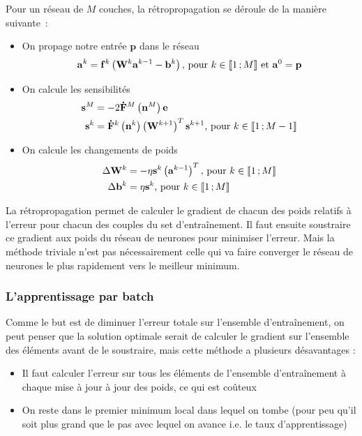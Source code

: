 Pour un réseau de $M$ couches, la rétropropagation se déroule de la manière suivante~:
\begin{itemize}
 \item On propage notre entrée $\mathbf{p}$ dans le réseau
 \begin{equation}
   \mathbf{a}^k = \mathbf{f}^k\left(\mathbf{W}^k\mathbf{a}^{k-1} - \mathbf{b}^k\right) \text{, pour $k \in \mathopen{\llbracket}1\,;M\mathclose{\rrbracket}$ et $\mathbf{a}^0 = \mathbf{p}$}
 \end{equation}
 
 \item On calcule les sensibilités 
 \begin{align}
  \mathbf{s}^M &= -2\mathbf{\dot F}^M\left(\mathbf{n}^M\right)\mathbf{e} \\
  \mathbf{s}^k &= \mathbf{\dot F}^k\left(\mathbf{n}^k\right)\left(\mathbf{W}^{k+1}\right)^T \mathbf{s}^{k+1} \text{, pour $k \in \mathopen{\llbracket}1\,;M-1\mathclose{\rrbracket}$}
 \end{align}
 
 \item On calcule les changements de poids
 \begin{align}
  \Delta \mathbf{W}^k &= - \eta \mathbf{s}^k\left(\mathbf{a}^{k-1}\right)^T \text{, pour $k \in \mathopen{\llbracket}1\,;M\mathclose{\rrbracket}$} \\
  \Delta \mathbf{b}^k &= \eta \mathbf{s}^k \text{, pour $k \in \mathopen{\llbracket}1\,;M\mathclose{\rrbracket}$}
 \end{align}

\end{itemize}

La rétropropagation permet de calculer le gradient de chacun des poids relatifs à l'erreur pour chacun des couples du set d'entraînement. Il faut ensuite soustraire ce gradient
aux poids du réseau de neurones pour minimiser l'erreur. Mais la méthode triviale n'est pas nécessairement celle qui va faire converger le réseau de neurones le plus rapidement vers le meilleur minimum.

\subsubsection{L'apprentissage par batch}

Comme le but est de diminuer l'erreur totale sur l'ensemble d'entraînement, on peut penser que la solution optimale serait de calculer le gradient sur l'ensemble des éléments avant de le soustraire, mais cette méthode a plusieurs désavantages :
\begin{itemize}
 \item Il faut calculer l'erreur sur tous les éléments de l'ensemble d'entraînement à chaque mise à jour à jour des poids, ce qui est coûteux
 \item On reste dans le premier minimum local dans lequel on tombe (pour peu qu'il soit plus grand que le pas avec lequel on avance i.e. le taux d'apprentissage)
\end{itemize}

